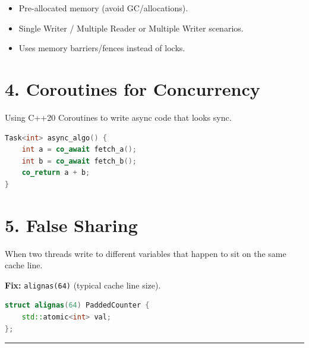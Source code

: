 \begin{itemize}
\tightlist
\item
  Pre-allocated memory (avoid GC/allocations).
\item
  Single Writer / Multiple Reader or Multiple Writer scenarios.
\item
  Uses memory barriers/fences instead of locks.
\end{itemize}

\hypertarget{coroutines-for-concurrency}{%
\section{4. Coroutines for
Concurrency}\label{coroutines-for-concurrency}}

Using C++20 Coroutines to write async code that looks sync.

\begin{lstlisting}[language={C++}]
Task<int> async_algo() {
    int a = co_await fetch_a();
    int b = co_await fetch_b();
    co_return a + b;
}
\end{lstlisting}

\hypertarget{false-sharing}{%
\section{5. False Sharing}\label{false-sharing}}

When two threads write to different variables that happen to sit on the
same cache line.

\textbf{Fix:} \passthrough{\lstinline!alignas(64)!} (typical cache line
size).

\begin{lstlisting}[language={C++}]
struct alignas(64) PaddedCounter {
    std::atomic<int> val;
};
\end{lstlisting}

\begin{center}\rule{0.5\linewidth}{0.5pt}\end{center}

